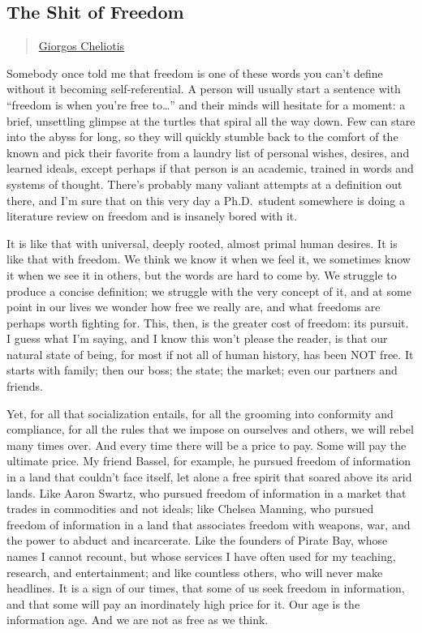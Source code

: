 \subsection{The Shit of Freedom}\label{the-shit-of-freedom}

\begin{quote}
\hyperlink{giorgos-cheliotis}{Giorgos
Cheliotis}
\end{quote}

Somebody once told me that freedom is one of these words you can't
define without it becoming self-referential. A person will usually start
a sentence with ``freedom is when you're free to\ldots{}'' and their
minds will hesitate for a moment: a brief, unsettling glimpse at the
turtles that spiral all the way down. Few can stare into the abyss for
long, so they will quickly stumble back to the comfort of the known and
pick their favorite from a laundry list of personal wishes, desires, and
learned ideals, except perhaps if that person is an academic, trained in
words and systems of thought. There's probably many valiant attempts at
a definition out there, and I'm sure that on this very day a
Ph.D.~student somewhere is doing a literature review on freedom and is
insanely bored with it.

It is like that with universal, deeply rooted, almost primal human
desires. It is like that with freedom. We think we know it when we feel
it, we sometimes know it when we see it in others, but the words are
hard to come by. We struggle to produce a concise definition; we
struggle with the very concept of it, and at some point in our lives we
wonder how free we really are, and what freedoms are perhaps worth
fighting for. This, then, is the greater cost of freedom: its pursuit. I
guess what I'm saying, and I know this won't please the reader, is that
our natural state of being, for most if not all of human history, has
been NOT free. It starts with family; then our boss; the state; the
market; even our partners and friends.

Yet, for all that socialization entails, for all the grooming into
conformity and compliance, for all the rules that we impose on ourselves
and others, we will rebel many times over. And every time there will be
a price to pay. Some will pay the ultimate price. My friend Bassel, for
example, he pursued freedom of information in a land that couldn't face
itself, let alone a free spirit that soared above its arid lands. Like
Aaron Swartz, who pursued freedom of information in a market that trades
in commodities and not ideals; like Chelsea Manning, who pursued freedom
of information in a land that associates freedom with weapons, war, and
the power to abduct and incarcerate. Like the founders of Pirate Bay,
whose names I cannot recount, but whose services I have often used for
my teaching, research, and entertainment; and like countless others, who
will never make headlines. It is a sign of our times, that some of us
seek freedom in information, and that some will pay an inordinately high
price for it. Our age is the information age. And we are not as free as
we think.

